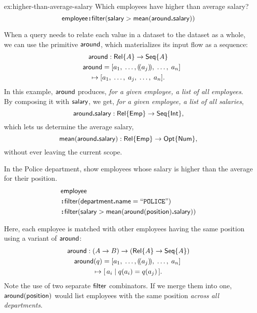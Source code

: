 \begin{demobis}{ex:higher-than-average-salary}
    Which employees have higher than average salary?
    \begin{equation*}
        \mathsf{employee}\!\boldsymbol{:}\!\mathsf{filter}(\mathsf{salary} > \mathsf{mean}(\mathsf{around}\boldsymbol{.}\mathsf{salary}))
    \end{equation*}
\end{demobis}

When a query needs to relate each value in a dataset to the dataset as a whole,
we can use the primitive $\mathsf{around}$, which materializes its input flow as a
sequence:
\begin{multline*}
    \Around : \Rel{A} \to \Seq{A} \\
    \shoveleft{\Around = [a_1,\;\ldots,\selected{a_j},\;\ldots,\;a_n]} \\
    \mapsto [a_1,\;\ldots,\;a_j,\;\ldots,\;a_n].
\end{multline*}
In this example, $\mathsf{around}$ produces, \emph{for a given employee, a list of all
employees}.  By composing it with $\mathsf{salary}$, we get, \emph{for a given
employee, a list of all salaries},
\begin{equation*}
    \mathsf{around}\boldsymbol{.}\mathsf{salary} : \mathsf{Rel}{\left\{\mathsf{Emp}\right\}} \to \mathsf{Seq}{\left\{\mathsf{Int}\right\}},
\end{equation*}
which lets us determine the average salary,
\begin{equation*}
    \mathsf{mean}(\mathsf{around}\boldsymbol{.}\mathsf{salary}) : \mathsf{Rel}{\left\{\mathsf{Emp}\right\}} \to \mathsf{Opt}{\left\{\mathsf{Num}\right\}},
\end{equation*}
without ever leaving the current scope.

\begin{demo}
    In the Police department, show employees whose salary is higher than the
    average for their position.
    \begin{align*}
        & \mathsf{employee} \\
        & \!\boldsymbol{:}\!\mathsf{filter}(\mathsf{department}\boldsymbol{.}\mathsf{name}=\mathtt{``POLICE"}) \\
        & \!\boldsymbol{:}\!\mathsf{filter}(\mathsf{salary} > \mathsf{mean}(\mathsf{around}(\mathsf{position})\boldsymbol{.}\mathsf{salary}))
    \end{align*}
\end{demo}

Here, each employee is matched with other employees having the same position
using a variant of $\mathsf{around}$:
\begin{multline*}
    \Around : (A \to B) \to (\Rel{A} \to \Seq{A}) \\
    \shoveleft{\Around(q) = [a_1,\;\ldots,\selected{a_j},\;\ldots,\;a_n]} \\
    \mapsto [\,a_i \mid q(a_i)=q(a_j)\,].
\end{multline*}
Note the use of two separate $\mathsf{filter}$ combinators.  If we merge them into one,
$\mathsf{around}(\mathsf{position})$ would list employees with the same position \emph{across
all departments}.

